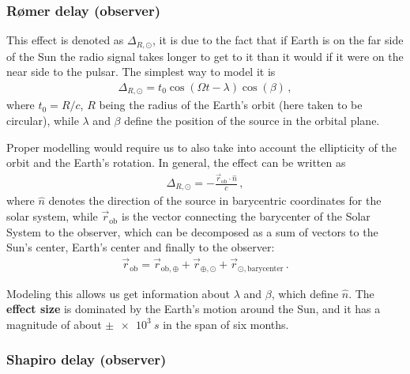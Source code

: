 \documentclass[main.tex]{subfiles}
\begin{document}
\subsubsection{Rømer delay (observer)}



This effect is denoted as \(\Delta_{R, {\odot}}\), it is due to the fact that if Earth is on the far side of the Sun the radio signal takes longer to get to it than it would if it were on the near side to the pulsar. The simplest way to model it is  
%
\begin{align}
\Delta_{R, {\odot}} = t_0 \cos(\Omega t - \lambda ) \cos(\beta )
\,,
\end{align}
%
where \(t_0 = R / c\), \(R\) being the radius of the Earth's orbit (here taken to be circular), while \(\lambda \) and \(\beta \) define the position of the source in the orbital plane. 

Proper modelling would require us to also take into account the ellipticity of the orbit and the Earth's rotation. 
In general, the effect can be written as 
%
\begin{align}
\Delta_{R, {\odot}} = - \frac{\vec{r} _{\text{ob}} \cdot \hat{n}}{c}
\,,
\end{align}
%
where \(\hat{n}\) denotes the direction of the source in barycentric coordinates for the solar system, while \(\vec{r} _{\text{ob}}\) is the vector connecting the barycenter of the Solar System to the observer, which can be decomposed as a sum of vectors to the Sun's center, Earth's center and finally to the observer:
%
\begin{align}
\vec{r} _{\text{ob}} = \vec{r}_{\text{ob}, \oplus} + \vec{r}_{\oplus, \odot} + \vec{r}_{\odot, \text{barycenter}}
\,.
\end{align}

Modeling this allows us get information about \(\lambda \) and \(\beta \), which define \(\hat{n}\). 
The \textbf{effect size} is dominated by the Earth's motion around the Sun, and it has a magnitude of about \(\pm \SI{e3}{s}\) in the span of six months.

\subsubsection{Shapiro delay (observer)}
\end{document}
